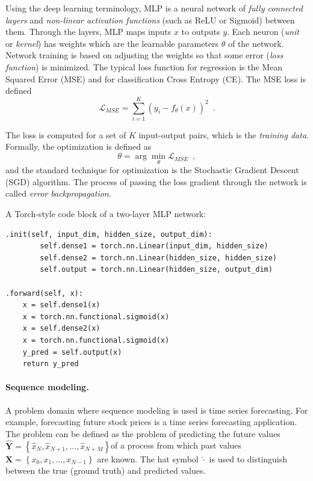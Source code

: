 \documentclass[final]{article}
\begin{document}
Using the deep learning terminology, MLP is a neural network of
\textit{fully connected layers} and \textit{non-linear activation
  functions} (such as ReLU or Sigmoid) between them. Through the
layers, MLP maps inputs $x$ to outputs $y$. Each neuron (\textit{unit}
or \textit{kernel}) has weights which are the learnable
parameters $\theta$ of the network. Network training is based on
adjusting the weights so that some error (\textit{loss function})
is minimized. The typical loss function for regression is the Mean
Squared Error (MSE) and for classification Cross Entropy (CE). The MSE
loss is defined
\[
\mathcal{L}_{MSE} = \sum_{i=1}^{K} (y_i-f_\theta (x))^2 \enspace .
\]


The loss is computed for a set of $K$ input-output pairs, which is
the \textit{training data}. Formally, the optimization is defined
as
\[
\theta = \arg\min_{\theta} \mathcal{L}_{MSE} \enspace ,
\]
and the standard technique for optimization is the Stochastic Gradient
Descent (SGD) algorithm. The process of passing the loss gradient
through the network is called \textit{error backpropagation}.

A Torch-style code block of a two-layer MLP network:
\begin{lstlisting}
.init(self, input_dim, hidden_size, output_dim):
        self.dense1 = torch.nn.Linear(input_dim, hidden_size)
        self.dense2 = torch.nn.Linear(hidden_size, hidden_size)
        self.output = torch.nn.Linear(hidden_size, output_dim)

.forward(self, x):
    x = self.dense1(x)
    x = torch.nn.functional.sigmoid(x)
    x = self.dense2(x)
    x = torch.nn.functional.sigmoid(x)
    y_pred = self.output(x)
    return y_pred
\end{lstlisting}



\paragraph{Sequence modeling.}
A problem domain where sequence modeling is used is time series
forecasting. For example, forecasting future stock prices is a time
series forecasting application. The problem can be defined as the
problem of predicting the future values 
$\hat{\mathbf{Y}} = \left\{ \hat{x}_N, \hat{x}_{N+1}, \ldots, \hat{x}_{N+M} \right\}$of a process
from which past values $\mathbf{X} = \left\{ x_0, x_{1}, \ldots, x_{N-1} \right\}$ are known.
The hat symbol $\hat{\cdot}$ is used to distinguish between the true
(ground truth) and predicted values.
\end{document}
